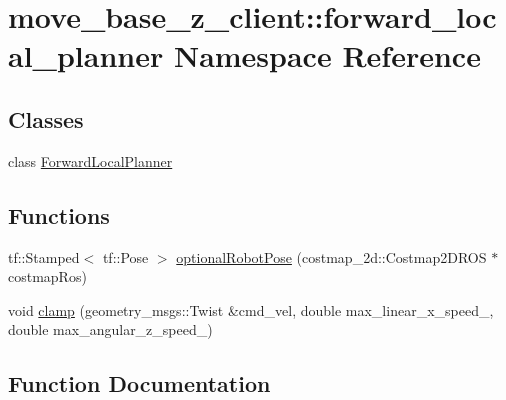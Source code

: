 \hypertarget{namespacemove__base__z__client_1_1forward__local__planner}{}\section{move\+\_\+base\+\_\+z\+\_\+client\+:\+:forward\+\_\+local\+\_\+planner Namespace Reference}
\label{namespacemove__base__z__client_1_1forward__local__planner}
\subsection*{Classes}
\begin{DoxyCompactItemize}
\item 
class \hyperlink{classmove__base__z__client_1_1forward__local__planner_1_1ForwardLocalPlanner}{Forward\+Local\+Planner}
\end{DoxyCompactItemize}
\subsection*{Functions}
\begin{DoxyCompactItemize}
\item 
tf\+::\+Stamped$<$ tf\+::\+Pose $>$ \hyperlink{namespacemove__base__z__client_1_1forward__local__planner_a683a39a154ed5aa179fdb1afb7bfe2e4}{optional\+Robot\+Pose} (costmap\+\_\+2d\+::\+Costmap2\+D\+R\+OS $\ast$costmap\+Ros)
\item 
void \hyperlink{namespacemove__base__z__client_1_1forward__local__planner_a5d0513634a69cbd890b025cd3731d687}{clamp} (geometry\+\_\+msgs\+::\+Twist \&cmd\+\_\+vel, double max\+\_\+linear\+\_\+x\+\_\+speed\+\_\+, double max\+\_\+angular\+\_\+z\+\_\+speed\+\_\+)
\end{DoxyCompactItemize}


\subsection{Function Documentation}
